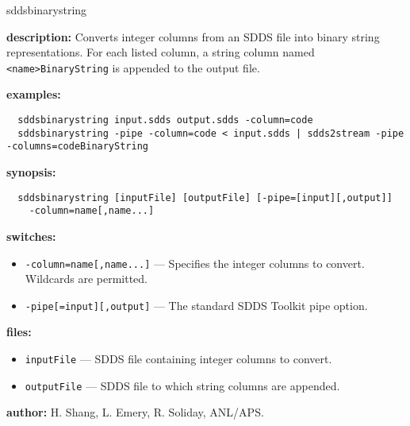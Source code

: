 \begin{sddsprog}{sddsbinarystring}
  \item \textbf{description:}
  Converts integer columns from an SDDS file into binary string representations.
  For each listed column, a string column named \verb|<name>BinaryString| is appended
  to the output file.

  \item \textbf{examples:}
  \begin{verbatim}
  sddsbinarystring input.sdds output.sdds -column=code
  sddsbinarystring -pipe -column=code < input.sdds | sdds2stream -pipe -columns=codeBinaryString
  \end{verbatim}

  \item \textbf{synopsis:}
  \begin{verbatim}
  sddsbinarystring [inputFile] [outputFile] [-pipe=[input][,output]]
    -column=name[,name...]
  \end{verbatim}

  \item \textbf{switches:}
  \begin{itemize}
    \item \verb|-column=name[,name...]| --- Specifies the integer columns to convert. Wildcards are permitted.
    \item \verb|-pipe[=input][,output]| --- The standard SDDS Toolkit pipe option.
  \end{itemize}

  \item \textbf{files:}
  \begin{itemize}
    \item \verb|inputFile| --- SDDS file containing integer columns to convert.
    \item \verb|outputFile| --- SDDS file to which string columns are appended.
  \end{itemize}

  \item \textbf{author:} H. Shang, L. Emery, R. Soliday, ANL/APS.
\end{sddsprog}
